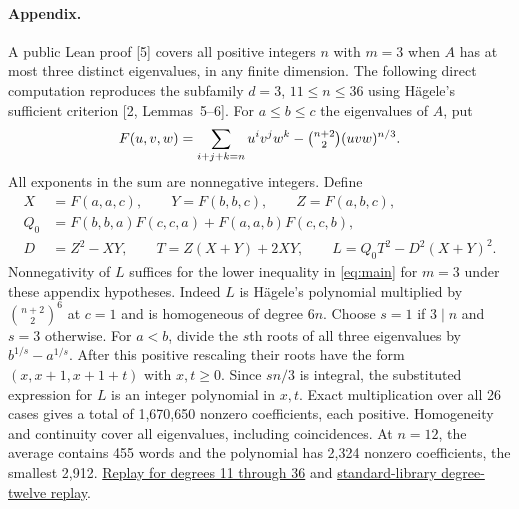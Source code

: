 \documentclass[11pt]{article}
\begin{document}
\paragraph{Appendix.}
A public Lean proof [5] covers all positive integers $n$ with $m=3$
when $A$ has at most three distinct eigenvalues, in any finite dimension.
The following direct computation reproduces the subfamily $d=3$,
$11\le n\le36$ using H\"agele's sufficient criterion [2, Lemmas~5--6].
For $a\le b\le c$ the eigenvalues of $A$, put
\[
 F(u,v,w)=\sum_{i+j+k=n}u^iv^jw^k-\tbinom{n+2}{2}(uvw)^{n/3}.
\]
All exponents in the sum are nonnegative integers. Define
\begin{align*}
 X&=F(a,a,c),\qquad Y=F(b,b,c),\qquad Z=F(a,b,c),\\
 Q_0&=F(b,b,a)F(c,c,a)+F(a,a,b)F(c,c,b),\\
 D&=Z^2-XY,\qquad T=Z(X+Y)+2XY,\qquad L=Q_0T^2-D^2(X+Y)^2.
\end{align*}
Nonnegativity of $L$ suffices for the lower inequality in \eqref{eq:main}
for $m=3$ under these appendix hypotheses. Indeed $L$ is H\"agele's
polynomial multiplied by $\binom{n+2}{2}^6$ at $c=1$ and is homogeneous
of degree $6n$. Choose $s=1$ if $3\mid n$ and $s=3$ otherwise. For $a<b$,
divide the $s$th roots of all three eigenvalues by $b^{1/s}-a^{1/s}$.
After this positive rescaling their roots have the form $(x,x+1,x+1+t)$
with $x,t\ge0$. Since $sn/3$ is integral, the substituted expression for
$L$ is an integer polynomial in $x,t$. Exact multiplication over all
26 cases gives a total of 1,670,650 nonzero coefficients, each positive.
Homogeneity and continuity cover all eigenvalues, including coincidences.
At $n=12$, the average contains 455 words and the polynomial has 2,324
nonzero coefficients, the smallest 2,912.
\href{https://github.com/shunyaekam/oo-research/blob/research/checks/bmv_degrees.py}{Replay for degrees 11 through 36}
and \href{https://github.com/shunyaekam/oo-research/blob/research/checks/next_intake_bmv.py}{standard-library degree-twelve replay}.
\end{document}
